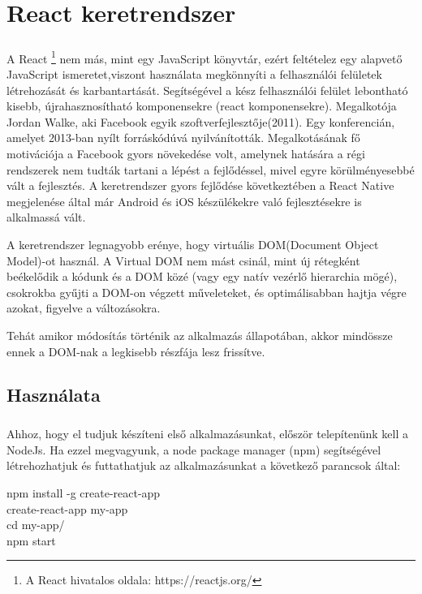 \chapter{React keretrendszer}\label{ch:progik}

\paragraph{}
A React \footnote{A React hivatalos oldala: https://reactjs.org/} nem más, mint egy JavaScript könyvtár, ezért feltételez egy alapvető JavaScript ismeretet,viszont használata megkönnyíti a felhasználói felületek létrehozását és karbantartását. Segítségével a kész felhasználói felület lebontható kisebb, újrahasznosítható komponensekre (react komponensekre). Megalkotója Jordan Walke, aki Facebook egyik szoftverfejlesztője(2011). Egy konferencián, amelyet 2013-ban nyílt forráskódúvá nyilvánították. Megalkotásának fő motivációja a Facebook gyors növekedése volt, amelynek hatására a régi rendszerek nem tudták tartani a lépést a fejlődéssel, mivel egyre körülményesebbé vált a fejlesztés. A keretrendszer gyors fejlődése következtében a React Native megjelenése által már Android és iOS készülékekre való fejlesztésekre is alkalmassá vált. 

A keretrendszer legnagyobb erénye, hogy virtuális DOM(Document Object Model)-ot használ. A Virtual DOM nem mást csinál, mint új rétegként beékelődik a kódunk és a DOM közé (vagy egy natív vezérlő hierarchia mögé), csokrokba gyűjti a DOM-on végzett műveleteket, és optimálisabban hajtja végre azokat, figyelve a változásokra.

Tehát amikor módosítás történik az alkalmazás állapotában, akkor mindössze ennek a DOM-nak a legkisebb részfája lesz frissítve.

\section{Használata}
\paragraph{}
Ahhoz, hogy el tudjuk készíteni első alkalmazásunkat, először telepítenünk kell a NodeJs. Ha ezzel megvagyunk, a node package manager (npm) segítségével létrehozhatjuk és futtathatjuk az alkalmazásunkat a következő parancsok által:
\begin{center}
npm install -g create-react-app \\
create-react-app my-app  \\
cd my-app/  \\ 
npm start \\
\end{center}

